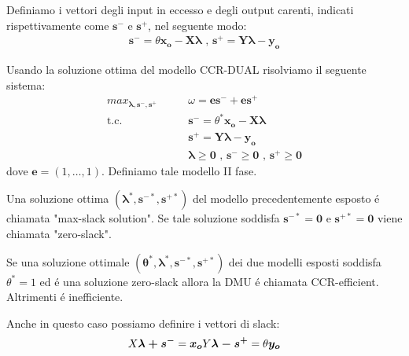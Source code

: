 \begin{definiz}
Definiamo i vettori degli input in eccesso e degli output carenti, indicati rispettivamente come $\boldsymbol{s^{-}}$ e $\boldsymbol{s^{+}}$, nel seguente modo:
\begin{equation}
\begin{split}
\boldsymbol{s^{-}} = \theta \boldsymbol{x_o} - \boldsymbol{X \lambda} \text{ , }
\boldsymbol{s^{+}} = \boldsymbol{Y \lambda} -\boldsymbol{y_o}
\end{split}
\end{equation}
\end{definiz}
\begin{definiz} Usando la soluzione ottima del modello CCR-DUAL risolviamo il seguente sistema:
\begin{equation} \label{EQ:ccr-leq2}
\begin{split}
max_{\boldsymbol{\lambda, s^{-},s^{+}}} & \qquad \omega = \boldsymbol{es^{-} + es^{+}} \\ \text{t.c.} & \qquad \boldsymbol{s^{-}} = \theta^{*}\boldsymbol{x_o - X\lambda} \\ & \qquad
\boldsymbol{s^{+}} = \boldsymbol{Y\lambda - y_o} \\ & \qquad \boldsymbol{\lambda \geq 0 \text{ , } s^{-} \geq 0 \text{ , } s^{+} \geq 0} 
\end{split}
\end{equation}
dove $\boldsymbol{e} = (1,\ldots ,1)$. Definiamo tale modello II fase.
\end{definiz}
\begin{definiz}
Una soluzione ottima $(\boldsymbol{\lambda^*, s^{-*}, s^{+*}})$ del modello precedentemente esposto \'e  chiamata "max-slack solution". Se tale soluzione soddisfa $\boldsymbol{s^{-*} = 0}$ e $\boldsymbol{s^{+*} = 0}$ viene chiamata "zero-slack".
\end{definiz}
\begin{definiz}
Se una soluzione ottimale $(\boldsymbol{\theta^{*},\lambda^*, s^{-*}, s^{+*}})$ dei due modelli esposti soddisfa $\theta^* = 1$ ed \'e una soluzione zero-slack allora la DMU \'e chiamata CCR-efficient. Altrimenti \'e inefficiente.
\end{definiz}
\begin{oss}
Anche in questo caso possiamo definire i vettori di slack:
\begin{equation}
X\boldsymbol{\lambda + s^{-}} = \boldsymbol{x_o} \\
Y\boldsymbol{\lambda - s^{+}} = \theta\boldsymbol{y_o} 
\end{equation}
\end{oss}
